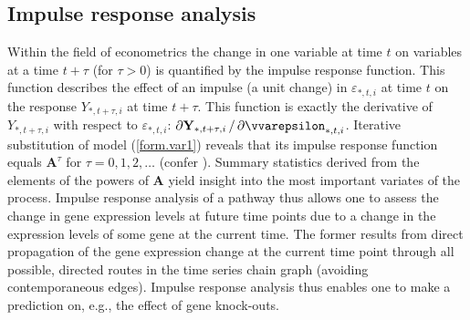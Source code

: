 \subsection{Impulse response analysis} \label{sect:impulseResponse}
Within the field of econometrics the change in one variable at time $t$ on variables at a time $t + \tau$ (for $\tau > 0$) is quantified by the impulse response function. This function describes the effect of an impulse (a unit change) in $\varepsilon_{\ast, t, i}$ at time $t$ on the response $Y_{\ast, t+\tau, i}$ at time $t + \tau$. This function is exactly the derivative of $Y_{\ast, t+\tau, i}$ with respect to $\varepsilon_{\ast, t, i}$: $\partial \mathbf{Y}_{\ast,  t+\tau, i}\, / \, \partial \vvarepsilon_{\ast, t, i}$. Iterative substitution of model (\ref{form.var1}) reveals that its impulse response function equals $\mathbf{A}^{\tau}$ for  $\tau=0, 1, 2, \ldots$ (confer \cite{Hamilton1994}). Summary statistics derived from the elements of the powers of $\mathbf{A}$ yield insight into the most important variates of the process. Impulse response analysis of a pathway thus allows one to assess the change in gene expression levels at future time points due to a change in the expression levels of some gene at the current time. The former results from direct propagation of the gene expression change at the current time point through all possible, directed routes in the time series chain graph (avoiding contemporaneous edges). Impulse response analysis thus enables one to make a prediction on, e.g., the effect of gene knock-outs.

